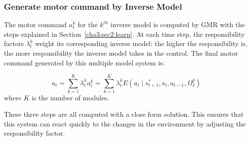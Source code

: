 \subsubsection{Generate motor command by Inverse Model}
\label{cha4:sec2:control:inverse}


The motor command $a^k_t$ for the $k^{th}$ inverse model is computed
by GMR with the steps explained in Section~\ref{cha3:sec2:learn}. At each time
step, the responsibility factors $\lambda^k_t$ weight its
corresponding inverse model: the higher the responsibility is, the
more responsibility the inverse model takes in the control. The final
motor command generated by this multiple model system is:

\begin{equation}
\label{e_mix}
a_t = \sum_{k=1}^K{\lambda_t^k a_t^k} = \sum_{k=1}^K{\lambda_t^k E\left({a_t \mid s^*_{t+1},s_t, a_{t-1}, \Omega^k_I}\right)}
\end{equation}
where $K$ is the number of modules.

These three steps are all computed with a close form solution. This ensures that this system can react quickly to the changes in the environment by adjusting the responsibility factor.



